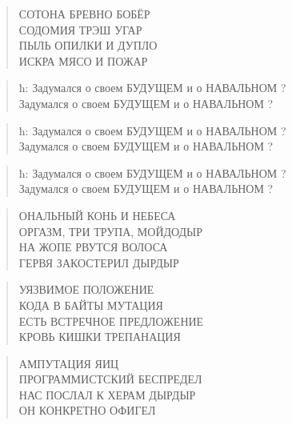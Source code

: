 \poemtitle{***}
\begin{verse}
СОТОНА БРЕВНО БОБЁР\\
СОДОМИЯ ТРЭШ УГАР\\
ПЫЛЬ ОПИЛКИ И ДУПЛО\\
ИСКРА МЯСО И ПОЖАР
\end{verse}

\poemtitle{***}
\begin{verse}
ħ: Задумался о своем БУДУЩЕМ и о НАВАЛЬНОМ ?\\
Задумался о своем БУДУЩЕМ и о НАВАЛЬНОМ ?
\end{verse}

\poemtitle{***}
\begin{verse}
ħ: Задумался о своем БУДУЩЕМ и о НАВАЛЬНОМ ?\\
Задумался о своем БУДУЩЕМ и о НАВАЛЬНОМ ?
\end{verse}

\poemtitle{***}
\begin{verse}
ħ: Задумался о своем БУДУЩЕМ и о НАВАЛЬНОМ ?\\
Задумался о своем БУДУЩЕМ и о НАВАЛЬНОМ ?
\end{verse}

\poemtitle{***}
\begin{verse}
ОНАЛЬНЫЙ КОНЬ И НЕБЕСА\\
ОРГАЗМ, ТРИ ТРУПА, МОЙДОДЫР\\
НА ЖОПЕ РВУТСЯ ВОЛОСА\\
ГЕРВЯ ЗАКОСТЕРИЛ ДЫРДЫР
\end{verse}

\poemtitle{***}
\begin{verse}
УЯЗВИМОЕ ПОЛОЖЕНИЕ\\
КОДА В БАЙТЫ МУТАЦИЯ\\
ЕСТЬ ВСТРЕЧНОЕ ПРЕДЛОЖЕНИЕ\\
КРОВЬ КИШКИ ТРЕПАНАЦИЯ
\end{verse}

\poemtitle{***}
\begin{verse}
АМПУТАЦИЯ ЯИЦ\\
ПРОГРАММИСТСКИЙ БЕСПРЕДЕЛ\\
НАС ПОСЛАЛ К ХЕРАМ ДЫРДЫР\\
ОН КОНКРЕТНО ОФИГЕЛ
\end{verse}

